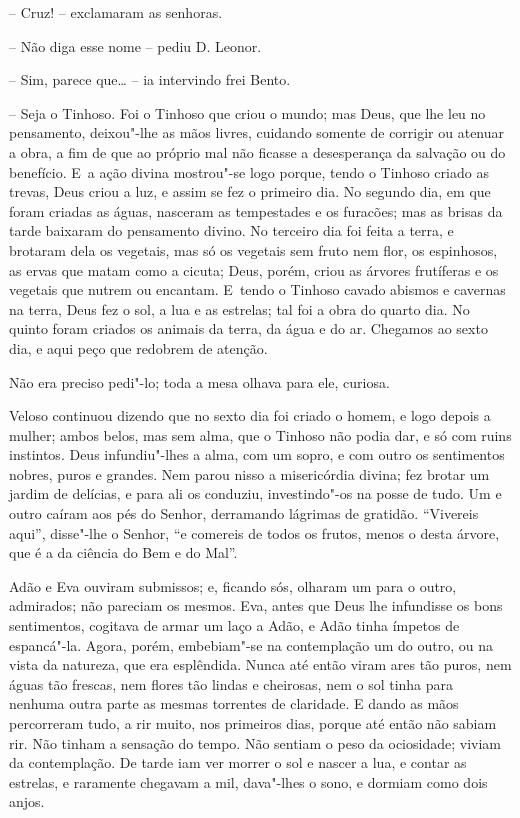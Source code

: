 -- Cruz! -- exclamaram as senhoras.

-- Não diga esse nome -- pediu D. Leonor.

-- Sim, parece que\ldots{} -- ia intervindo frei Bento.

-- Seja o Tinhoso. Foi o Tinhoso que criou o mundo; mas Deus, que lhe
leu no pensamento, deixou"-lhe as mãos livres, cuidando somente de
corrigir ou atenuar a obra, a fim de que ao próprio mal não ficasse a
desesperança da salvação ou do benefício. E~a ação divina mostrou"-se
logo porque, tendo o Tinhoso criado as trevas, Deus criou a luz, e assim
se fez o primeiro dia. No segundo dia, em que foram criadas as águas,
nasceram as tempestades e os furacões; mas as brisas da tarde baixaram
do pensamento divino. No terceiro dia foi feita a terra, e brotaram dela
os vegetais, mas só os vegetais sem fruto nem flor, os espinhosos, as
ervas que matam como a cicuta; Deus, porém, criou as árvores frutíferas
e os vegetais que nutrem ou encantam. E~tendo o Tinhoso cavado abismos e
cavernas na terra, Deus fez o sol, a lua e as estrelas; tal foi a obra
do quarto dia. No quinto foram criados os animais da terra, da água e do
ar. Chegamos ao sexto dia, e aqui peço que redobrem de atenção.

Não era preciso pedi"-lo; toda a mesa olhava para ele, curiosa.

Veloso continuou dizendo que no sexto dia foi criado o homem, e logo
depois a mulher; ambos belos, mas sem alma, que o Tinhoso não podia dar,
e só com ruins instintos. Deus infundiu"-lhes a alma, com um sopro, e com
outro os sentimentos nobres, puros e grandes. Nem parou nisso a
misericórdia divina; fez brotar um jardim de delícias, e para ali os
conduziu, investindo"-os na posse de tudo. Um e outro caíram aos pés do
Senhor, derramando lágrimas de gratidão. ``Vivereis aqui'', disse"-lhe o
Senhor, ``e comereis de todos os frutos, menos o desta árvore, que é a
da ciência do Bem e do Mal''.

Adão e Eva ouviram submissos; e, ficando sós, olharam um para o outro,
admirados; não pareciam os mesmos. Eva, antes que Deus lhe infundisse os
bons sentimentos, cogitava de armar um laço a Adão, e Adão tinha ímpetos
de espancá"-la. Agora, porém, embebiam"-se na contemplação um do outro, ou
na vista da natureza, que era esplêndida. Nunca até então viram ares tão
puros, nem águas tão frescas, nem flores tão lindas e cheirosas, nem o
sol tinha para nenhuma outra parte as mesmas torrentes de claridade. E
dando as mãos percorreram tudo, a rir muito, nos primeiros dias, porque
até então não sabiam rir. Não tinham a sensação do tempo. Não sentiam o
peso da ociosidade; viviam da contemplação. De tarde iam ver morrer o
sol e nascer a lua, e contar as estrelas, e raramente chegavam a mil,
dava"-lhes o sono, e dormiam como dois anjos.


